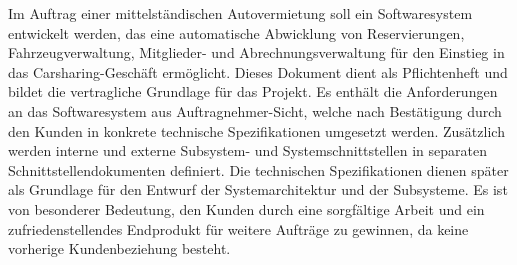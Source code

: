 Im Auftrag einer mittelständischen Autovermietung soll ein Softwaresystem entwickelt werden,
das eine automatische Abwicklung von Reservierungen, Fahrzeugverwaltung, Mitglieder- und Abrechnungsverwaltung
für den Einstieg in das Carsharing-Geschäft ermöglicht.
Dieses Dokument dient als Pflichtenheft und bildet die vertragliche Grundlage für das Projekt.
Es enthält die Anforderungen an das Softwaresystem aus Auftragnehmer-Sicht, welche nach Bestätigung durch den
Kunden in konkrete technische Spezifikationen umgesetzt werden.
Zusätzlich werden interne und externe Subsystem- und Systemschnittstellen in separaten Schnittstellendokumenten definiert.
Die technischen Spezifikationen dienen später als Grundlage für den Entwurf der Systemarchitektur und der Subsysteme.
Es ist von besonderer Bedeutung, den Kunden durch eine sorgfältige Arbeit und ein zufriedenstellendes Endprodukt für
weitere Aufträge zu gewinnen, da keine vorherige Kundenbeziehung besteht.